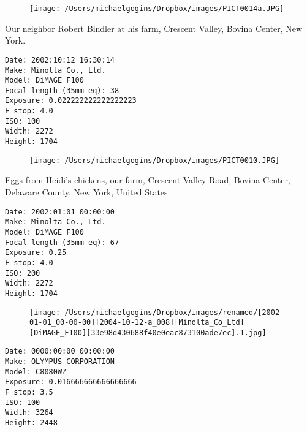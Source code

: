 \documentclass[11pt,letter,DIV=14,paper=landscape]{scrbook}
\begin{document}
\begin{figure}
\texttt{[image: /Users/michaelgogins/Dropbox/images/PICT0014a.JPG]}
\end{figure}
    
\clearpage
\noindent Our neighbor Robert Bindler at his farm, Crescent Valley, Bovina Center, New York.
\noindent
\begin{lstlisting}
Date: 2002:10:12 16:30:14
Make: Minolta Co., Ltd.
Model: DiMAGE F100
Focal length (35mm eq): 38
Exposure: 0.022222222222222223
F stop: 4.0
ISO: 100
Width: 2272
Height: 1704
\end{lstlisting}
\clearpage

\begin{figure}
\texttt{[image: /Users/michaelgogins/Dropbox/images/PICT0010.JPG]}
\end{figure}
    
\clearpage

\noindent Eggs from Heidi's chickens, our farm, Crescent Valley Road, Bovina Center, Delaware County, New York, United States.
\noindent
\begin{lstlisting}
Date: 2002:01:01 00:00:00
Make: Minolta Co., Ltd.
Model: DiMAGE F100
Focal length (35mm eq): 67
Exposure: 0.25
F stop: 4.0
ISO: 200
Width: 2272
Height: 1704
\end{lstlisting}
\clearpage

\begin{figure}
\texttt{[image: /Users/michaelgogins/Dropbox/images/renamed/[2002-01-01\_00-00-00][2004-10-12-a\_008][Minolta\_Co\_Ltd][DiMAGE\_F100][33e98d430688f40e0eac873100ade7ec].1.jpg]}
\end{figure}
    
\clearpage
\noindent 
\noindent
\begin{lstlisting}
Date: 0000:00:00 00:00:00
Make: OLYMPUS CORPORATION
Model: C8080WZ
Exposure: 0.016666666666666666
F stop: 3.5
ISO: 100
Width: 3264
Height: 2448
\end{lstlisting}
\clearpage
\end{document}
